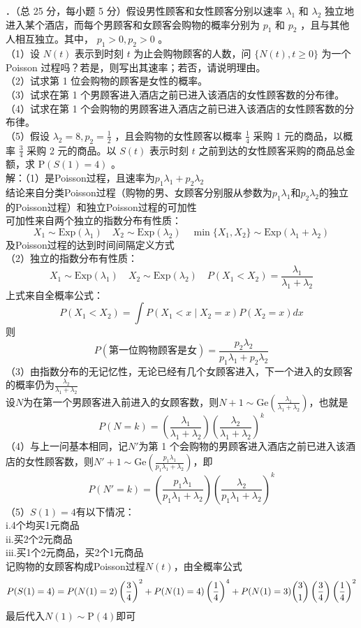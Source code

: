 \documentclass[UTF8]{ctexart}
\begin{document}
．（总 25 分，每小题 5 分）假设男性顾客和女性顾客分别以速率 $\lambda_{1}$ 和 $\lambda_{2}$ 独立地进入某个酒店，而每个男顾客和女顾客会购物的概率分别为 $p_{1}$ 和 $p_{2}$ ，且与其他人相互独立。其中， $p_{1}>0, p_{2}>0$ 。\\
（1）设 $N(t)$ 表示到时刻 $t$ 为止会购物顾客的人数，问 $\{N(t), t \geqslant 0\}$ 为一个 Poisson 过程吗？若是，则写出其速率；若否，请说明理由。\\
（2）试求第 1 位会购物的顾客是女性的概率。\\
（3）试求在第 1 个男顾客进入酒店之前已进入该酒店的女性顾客数的分布律。\\
（4）试求在第 1 个会购物的男顾客进入酒店之前已进入该酒店的女性顾客数的分布律。\\
（5）假设 $\lambda_{2}=8, p_{2}=\frac{1}{2}$ ，且会购物的女性顾客以概率 $\frac{1}{4}$ 采购 1 元的商品，以概率 $\frac{3}{4}$ 采购 2 元的商品。以 $S(t)$ 表示时刻 $t$ 之前到达的女性顾客采购的商品总金额，求 $\mathrm{P}(S(1)=4)$ 。\\
解：（1）是Poisson过程，且速率为$p_1\lambda_1+p_2\lambda_2$\\
结论来自分类Poisson过程（购物的男、女顾客分别服从参数为$p_1\lambda_1$和$p_2\lambda_2$的独立的Poisson过程）和独立Poisson过程的可加性\\
可加性来自两个独立的指数分布有性质：
\[
X_1 \sim \mathrm{Exp}(\lambda_1) \quad X_2 \sim \mathrm{Exp}(\lambda_2) \quad 
\min\{X_1,X_2\} \sim \mathrm{Exp}(\lambda_1+\lambda_2)
\]
及Poisson过程的达到时间间隔定义方式\\
（2）独立的指数分布有性质：
\[
X_1 \sim \mathrm{Exp}(\lambda_1) \quad X_2 \sim \mathrm{Exp}(\lambda_2) \quad P(X_1<X_2)=\frac{\lambda_1}{\lambda_1+\lambda_2}
\]
上式来自全概率公式：
\[
P(X_1<X_2)=\int P(X_1<x\mid X_2=x)P(X_2=x)dx
\]
则
\[
P(\text{第一位购物顾客是女})=\frac{p_2\lambda_2}{p_1\lambda_1+p_2\lambda_2}
\]
（3）由指数分布的无记忆性，无论已经有几个女顾客进入，下一个进入的女顾客的概率仍为$\frac{\lambda_2}{\lambda_1+\lambda_2}$\\
设$N$为在第一个男顾客进入前进入的女顾客数，则$N+1\sim \mathrm{Ge}\left( \frac{\lambda_1}{\lambda_1+\lambda_2}\right) $，也就是
	\[
	P(N=k)=\left(  \frac{\lambda_1}{\lambda_1+\lambda_2}\right)\left( \frac{\lambda_2}{\lambda_1+\lambda_2}\right)^k
	\]
（4）与上一问基本相同，记$N'$为第 1 个会购物的男顾客进入酒店之前已进入该酒店的女性顾客数，则$N'+1\sim \mathrm{Ge}\left( \frac{p_1\lambda_1}{p_1\lambda_1+\lambda_2}\right) $，即
\[
	P(N'=k)=\left(  \frac{p_1\lambda_1}{p_1\lambda_1+\lambda_2}\right)\left( \frac{\lambda_2}{p_1\lambda_1+\lambda_2}\right)^k
\]
（5）$S(1)=4$有以下情况：\\
i.4个均买1元商品\\
ii.买2个2元商品\\
iii.买1个2元商品，买2个1元商品\\
记购物的女顾客构成Poisson过程$N(t)$，由全概率公式
\[
P(S(1)=4)=P(N(1)=2)\left( \frac{3}{4}\right)^2+P(N(1)=4)\left(\frac{1}{4} \right)^4+P(N(1)=3)\dbinom{3}{1} \left( \frac{3}{4}\right) \left(\frac{1}{4} \right)^2 
\]
最后代入$N(1)\sim \mathrm{P}(4)$即可\\
\end{document}
